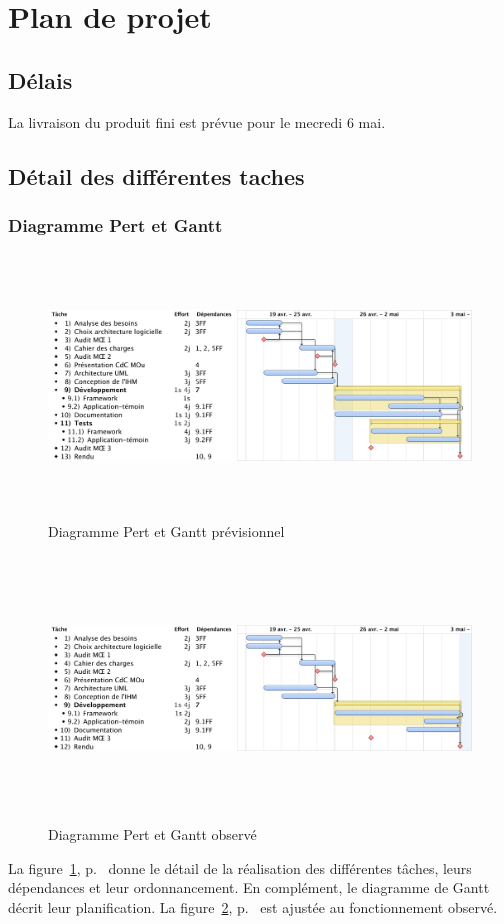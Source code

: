
\section{Plan de projet}
\subsection{Délais}
La livraison du produit fini est prévue pour le mecredi 6 mai.

\subsection{Détail des différentes taches}
\subsubsection{Diagramme Pert et Gantt}
\begin{figure}[thbp]
	\centering
		\includegraphics[height=7cm,angle=90]{../diagrammes/planification.pdf}
	\caption{Diagramme Pert et Gantt prévisionnel}
	\label{fig:pert}
\end{figure}
\begin{figure}[thbp]
	\centering
		\includegraphics[height=7cm,angle=90]{../diagrammes/gantt_final.pdf}
	\caption{Diagramme Pert et Gantt observé}
	\label{fig:observe}
\end{figure}
La figure~\ref{fig:pert}, p.~\pageref{fig:pert} donne le détail de la réalisation des différentes tâches, leurs dépendances et leur ordonnancement. En complément, le diagramme de Gantt décrit leur planification. La figure~\ref{fig:observe}, p.~\pageref{fig:observe} est ajustée au fonctionnement observé.

